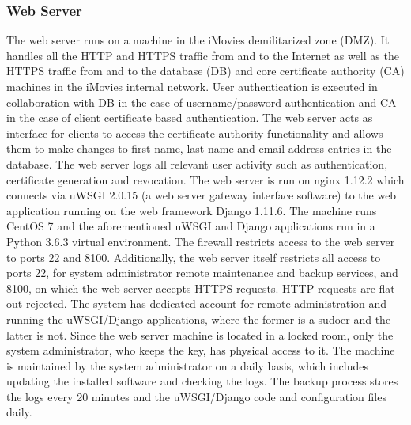 \documentclass[english]{article}
\begin{document}
\subsubsection{Web Server}
The web server runs on a machine in the iMovies demilitarized zone (DMZ). It handles all the HTTP and HTTPS traffic from and to the Internet as well as the HTTPS traffic from and to 
the database (DB) and core certificate authority (CA) machines in the iMovies internal network. User authentication is executed in collaboration with DB in the case of username/password authentication
and CA in the case of client certificate based authentication. The web server acts as interface for clients to access the certificate authority functionality and allows them to make changes to first name, last name
and email address entries in the database. The web server logs all relevant user activity such as authentication, certificate generation and revocation. The web server is run on nginx 1.12.2 which connects via uWSGI 2.0.15 (a web server gateway interface software) to the web application running
on the web framework Django 1.11.6. The machine runs CentOS 7 and the aforementioned uWSGI and Django applications run in a Python 3.6.3 virtual environment. The firewall restricts access to the web server to ports 22 and 8100. 
Additionally, the web server itself restricts all access to ports 22, for system administrator remote maintenance and backup services, and 8100, on which the web server accepts HTTPS requests. HTTP requests are flat out rejected. 
The system has dedicated account for remote administration and running the uWSGI/Django applications, where the former is a sudoer and the latter is not. Since the web server machine is located in a locked room, only the system 
administrator, who keeps the key, has physical access to it. The machine is maintained by the system administrator on a daily basis, which includes updating the installed software and checking the logs. The backup process stores the logs
every 20 minutes and the uWSGI/Django code and configuration files daily.
\end{document}

